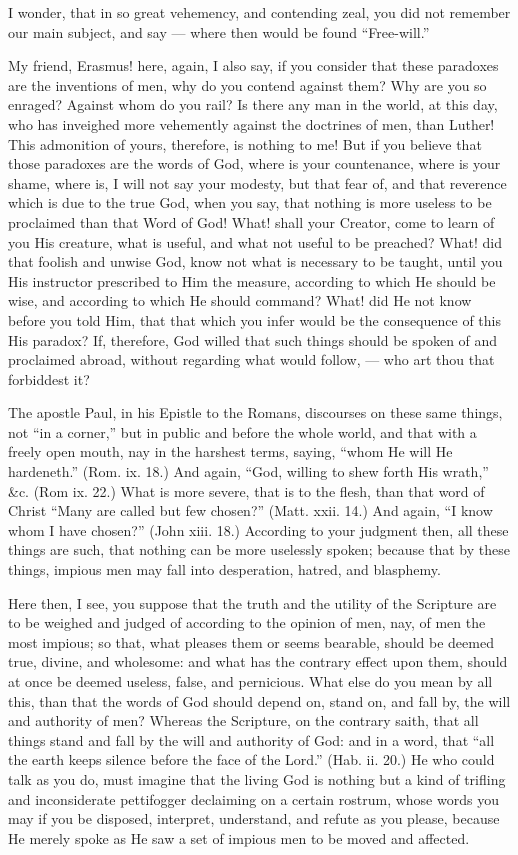 I wonder, that in so great vehemency, and contending zeal, you did not remember our main subject, and say — where then would be found “Free-will.”

My friend, Erasmus! here, again, I also say, if you consider that these paradoxes are the inventions of men, why do you contend against them? Why are you so enraged? Against whom do you rail? Is there any man in the world, at this day, who has inveighed more vehemently against the doctrines of men, than Luther! This admonition of yours, therefore, is nothing to me! But if you believe that those paradoxes are the words of God, where is your countenance, where is your shame, where is, I will not say your modesty, but that fear of, and that reverence which is due to the true God, when you say, that nothing is more useless to be proclaimed than that Word of God! What! shall your Creator, come to learn of you His creature, what is useful, and what not useful to be preached? What! did that foolish and unwise God, know not what is necessary to be taught, until you His instructor prescribed to Him the measure, according to which He should be wise, and according to which He should command? What! did He not know before you told Him, that that which you infer would be the consequence of this His paradox? If, therefore, God willed that such things should be spoken of and proclaimed abroad, without regarding what would follow, — who art thou that forbiddest it?

The apostle Paul, in his Epistle to the Romans, discourses on these same things, not “in a corner,” but in public and before the whole world, and that with a freely open mouth, nay in the harshest terms, saying, “whom He will He hardeneth.” (Rom. ix. 18.) And again, “God, willing to shew forth His wrath,” \&c. (Rom ix. 22.) What is more severe, that is to the flesh, than that word of Christ “Many are called but few chosen?” (Matt. xxii. 14.) And again, “I know whom I have chosen?” (John xiii. 18.) According to your judgment then, all these things are such, that nothing can be more uselessly spoken; because that by these things, impious men may fall into desperation, hatred, and blasphemy.

Here then, I see, you suppose that the truth and the utility of the Scripture are to be weighed and judged of according to the opinion of men, nay, of men the most impious; so that, what pleases them or seems bearable, should be deemed true, divine, and wholesome: and what has the contrary effect upon them, should at once be deemed useless, false, and pernicious. What else do you mean by all this, than that the words of God should depend on, stand on, and fall by, the will and authority of men? Whereas the Scripture, on the contrary saith, that all things stand and fall by the will and authority of God: and in a word, that “all the earth keeps silence before the face of the Lord.” (Hab. ii. 20.) He who could talk as you do, must imagine that the living God is nothing but a kind of trifling and inconsiderate pettifogger declaiming on a certain rostrum, whose words you may if you be disposed, interpret, understand, and refute as you please, because He merely spoke as He saw a set of impious men to be moved and affected.


